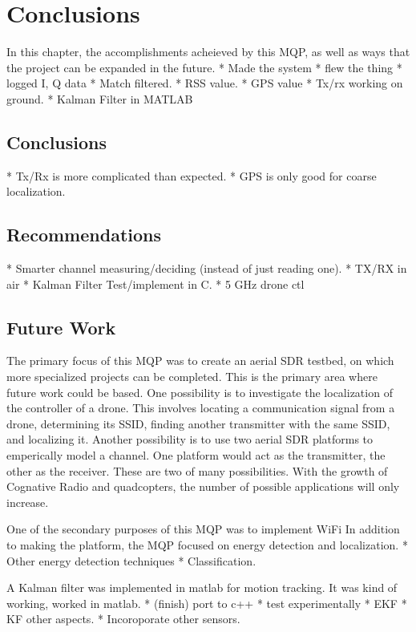 \chapter{Conclusions}
In this chapter, the accomplishments acheieved by this MQP, as well as ways that 
the project can be expanded in the future. 
 * Made the system
 * flew the thing
 * logged I, Q data
 * Match filtered.
 * RSS value.
 * GPS value
 * Tx/rx working on ground.
 * Kalman Filter in MATLAB

\section{Conclusions} %
 * Tx/Rx is more complicated than expected.
 * GPS is only good for coarse localization.

\section{Recommendations}
 * Smarter channel measuring/deciding (instead of just reading one).
 * TX/RX in air
 * Kalman Filter Test/implement in C.
 * 5 GHz drone ctl


\section{Future Work}
The primary focus of this MQP was to create an aerial SDR testbed, on which more 
specialized projects can be completed. This is the primary area where future work
could be based. One possibility is to investigate the localization of the controller
of a drone. This involves locating a communication signal from a drone, determining its
SSID, finding another transmitter with the same SSID, and localizing it. Another possibility
is to use two aerial SDR platforms to emperically model a channel. One platform
would act as the transmitter, the other as the receiver. These are two of many possibilities.
With the growth of Cognative Radio and quadcopters, the number of possible applications
will only increase.\par

One of the secondary purposes of this MQP was to implement WiFi
In addition to making the platform, the MQP focused on energy detection 
and localization. 
 * Other energy detection techniques
 * Classification. \par

A Kalman filter was implemented in matlab for motion tracking. It was kind of 
working, worked in matlab. 
 * (finish) port to c++
 * test experimentally
 * EKF
 * KF other aspects.
 * Incoroporate other sensors.